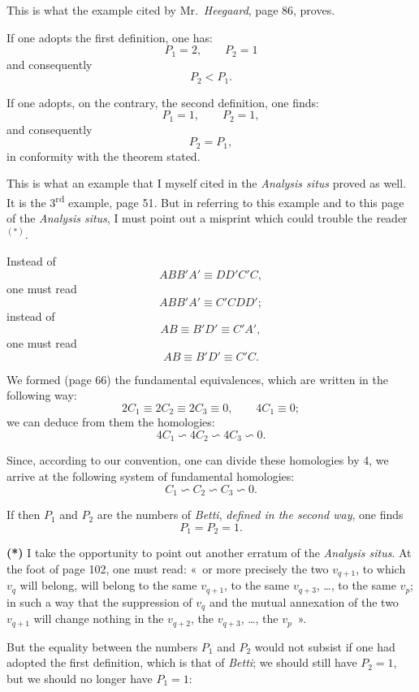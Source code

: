 \documentclass{article}
\begin{document}
This is what the example cited by Mr.~\emph{Heegaard}, page 86, proves.

If one adopts the first definition, one has:
\[ P_{1} = 2, \qquad P_{2} = 1 \]
and consequently
\[ P_{2} < P_{1}. \]

If one adopts, on the contrary, the second definition, one finds:
\[ P_{1} = 1, \qquad P_{2} = 1, \]
and consequently
\[ P_{2} = P_{1}, \]
in conformity with the theorem stated.


This is what an example that I myself cited in the \emph{Analysis situs} proved as well. It is the 3\textsuperscript{rd} example, page 51. But in referring to this example and to this page of the \emph{Analysis situs}, I must point out a misprint which could trouble the reader${}^{(*)}$.

Instead of
\[ ABB'A' \equiv DD'C'C, \]
one must read
\[ ABB'A' \equiv C'CDD'; \]
instead of
\[ AB \equiv B'D' \equiv C'A', \]
one must read
\[ AB \equiv B'D' \equiv C'C. \]

We formed (page 66) the fundamental equivalences, which are written in the following way:
\[ 2C_{1} \equiv 2C_{2} \equiv 2C_{3} \equiv 0, \qquad 4C_{1} \equiv 0; \]
we can deduce from them the homologies:
\[ 4C_{1} \backsim 4C_{2} \backsim 4C_{3} \backsim 0. \]

Since, according to our convention, one can divide these homologies by 4, we arrive at the following system of fundamental homologies:
\[ C_{1} \backsim C_{2} \backsim C_{3} \backsim 0. \]

If then $P_{1}$ and $P_{2}$ are the numbers of \emph{Betti}, \emph{defined in the second way}, one finds
\[ P_{1} = P_{2} = 1. \]

\textbf{(*)} I take the opportunity to point out another erratum of the \emph{Analysis situs}. At the foot of page 102, one must read: «~or more precisely the two $v_{q+1}$, to which $v_{q}$ will belong, will belong to the same $v_{q+1}$, to the same $v_{q+3}$, \ldots, to the same $v_{p}$; in such a way that the suppression of $v_{q}$ and the mutual annexation of the two $v_{q+1}$ will change nothing in the $v_{q+2}$, the $v_{q+3}$, \ldots, the $v_{p}$~».


But the equality between the numbers $P_{1}$ and $P_{2}$ would not subsist if one had adopted the first definition, which is that of \emph{Betti}; we should still have $P_{2} = 1$, but we should no longer have $P_{1} = 1$:
\end{document}

